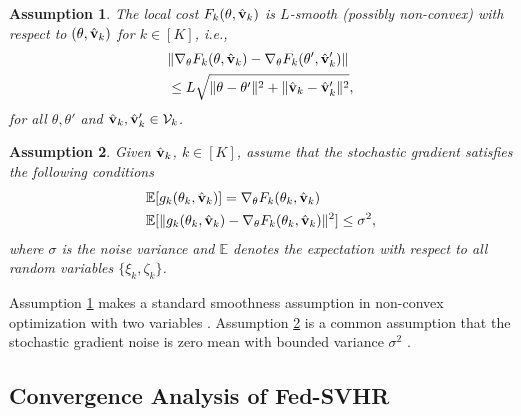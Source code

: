 \documentclass[twoside,journal]{IEEEtran}
\def\VectorFont{\bf}
\newcommand{\vv}{{\VectorFont v}}
\newtheorem{assumption}{Assumption}
\begin{document}
\begin{assumption}\label{ass: smooth}
The local cost $F_k(\theta,\hat{\vv}_{k})$ is $L$-smooth (possibly non-convex) with respect to $(\theta,\hat \vv_k)$ for $k\in [K]$, i.e.,
\begin{align}\label{L_smooth}
\nonumber&\|\nabla_{\theta}F_k(\theta,\hat{\vv}_{k})-\nabla_{\theta}F_k(\theta',\hat{\vv}'_{k})\|
\\
&\leq L\sqrt{\|\theta-\theta'\|^2+\|\hat{\vv}_{k}-\hat{\vv}_{k}'\|^2},
\end{align}for all $\theta, \theta'$ and $\hat \vv_k,\hat \vv'_k \in \mathcal{V}_k$.
\end{assumption}
\begin{assumption}\label{ass: un_var} Given $\hat{\vv}_k$,  $k\in [K]$, assume that the stochastic gradient satisfies the following conditions
\begin{align}
\label{eqn: unba}
&\mathbb{E}[g_k(\theta_k,\hat{\vv}_{k})]=\nabla_{\theta} F_k(\theta_k,\hat{\vv}_{k})\\
\label{eqn: var}&\mathbb{E}[\|g_k(\theta_k,\hat{\vv}_{k})-\nabla_{\theta} F_k(\theta_k,\hat{\vv}_{k})\|^2]\leq \sigma^2,
\end{align}
where $\sigma$ is the noise variance and $\mathbb{E}$  denotes the expectation with respect to all random variables $\{\xi_k,\zeta_k\}$.
\end{assumption}
Assumption \ref{ass: smooth} makes a standard smoothness assumption in non-convex optimization with two variables \cite{xu2015block}.
Assumption \ref{ass: un_var} is
a common assumption that the stochastic gradient noise is zero mean with bounded variance $\sigma^2$ \cite{karimireddy2020scaffold}.

\subsection{Convergence Analysis of Fed-SVHR}

\end{document}

